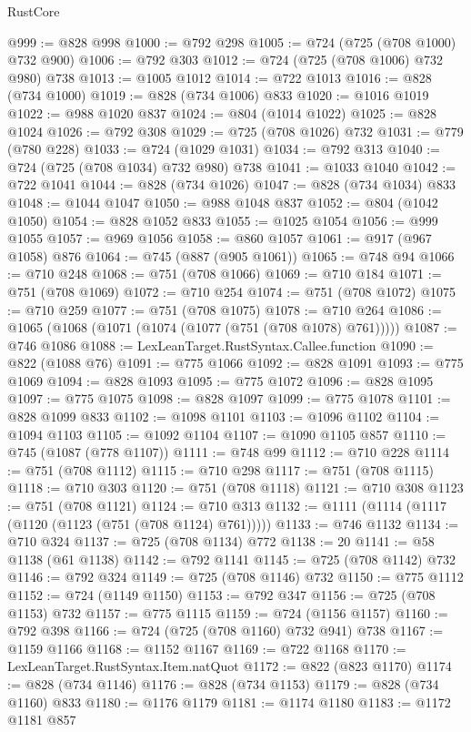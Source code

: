\begin{lexlean}{RustCore}
\begin{coremodule}
@999 := @828 @998
@1000 := @792 @298
@1005 := @724 (@725 (@708 @1000) @732 @900)
@1006 := @792 @303
@1012 := @724 (@725 (@708 @1006) @732 @980) @738
@1013 := @1005 @1012
@1014 := @722 @1013
@1016 := @828 (@734 @1000)
@1019 := @828 (@734 @1006) @833
@1020 := @1016 @1019
@1022 := @988 @1020 @837
@1024 := @804 (@1014 @1022)
@1025 := @828 @1024
@1026 := @792 @308
@1029 := @725 (@708 @1026) @732
@1031 := @779 (@780 @228)
@1033 := @724 (@1029 @1031)
@1034 := @792 @313
@1040 := @724 (@725 (@708 @1034) @732 @980) @738
@1041 := @1033 @1040
@1042 := @722 @1041
@1044 := @828 (@734 @1026)
@1047 := @828 (@734 @1034) @833
@1048 := @1044 @1047
@1050 := @988 @1048 @837
@1052 := @804 (@1042 @1050)
@1054 := @828 @1052 @833
@1055 := @1025 @1054
@1056 := @999 @1055
@1057 := @969 @1056
@1058 := @860 @1057
@1061 := @917 (@967 @1058) @876
@1064 := @745 (@887 (@905 @1061))
@1065 := @748 @94
@1066 := @710 @248
@1068 := @751 (@708 @1066)
@1069 := @710 @184
@1071 := @751 (@708 @1069)
@1072 := @710 @254
@1074 := @751 (@708 @1072)
@1075 := @710 @259
@1077 := @751 (@708 @1075)
@1078 := @710 @264
@1086 := @1065 (@1068 (@1071 (@1074 (@1077 (@751 (@708 @1078) @761)))))
@1087 := @746 @1086
@1088 := LexLeanTarget.RustSyntax.Callee.function
@1090 := @822 (@1088 @76)
@1091 := @775 @1066
@1092 := @828 @1091
@1093 := @775 @1069
@1094 := @828 @1093
@1095 := @775 @1072
@1096 := @828 @1095
@1097 := @775 @1075
@1098 := @828 @1097
@1099 := @775 @1078
@1101 := @828 @1099 @833
@1102 := @1098 @1101
@1103 := @1096 @1102
@1104 := @1094 @1103
@1105 := @1092 @1104
@1107 := @1090 @1105 @857
@1110 := @745 (@1087 (@778 @1107))
@1111 := @748 @99
@1112 := @710 @228
@1114 := @751 (@708 @1112)
@1115 := @710 @298
@1117 := @751 (@708 @1115)
@1118 := @710 @303
@1120 := @751 (@708 @1118)
@1121 := @710 @308
@1123 := @751 (@708 @1121)
@1124 := @710 @313
@1132 := @1111 (@1114 (@1117 (@1120 (@1123 (@751 (@708 @1124) @761)))))
@1133 := @746 @1132
@1134 := @710 @324
@1137 := @725 (@708 @1134) @772
@1138 := 20
@1141 := @58 @1138 (@61 @1138)
@1142 := @792 @1141
@1145 := @725 (@708 @1142) @732
@1146 := @792 @324
@1149 := @725 (@708 @1146) @732
@1150 := @775 @1112
@1152 := @724 (@1149 @1150)
@1153 := @792 @347
@1156 := @725 (@708 @1153) @732
@1157 := @775 @1115
@1159 := @724 (@1156 @1157)
@1160 := @792 @398
@1166 := @724 (@725 (@708 @1160) @732 @941) @738
@1167 := @1159 @1166
@1168 := @1152 @1167
@1169 := @722 @1168
@1170 := LexLeanTarget.RustSyntax.Item.natQuot
@1172 := @822 (@823 @1170)
@1174 := @828 (@734 @1146)
@1176 := @828 (@734 @1153)
@1179 := @828 (@734 @1160) @833
@1180 := @1176 @1179
@1181 := @1174 @1180
@1183 := @1172 @1181 @857

\end{coremodule}
\end{lexlean}
